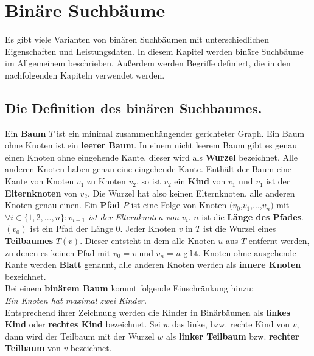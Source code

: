 \documentclass[a4paper,12pt]{article}
\begin{document}
\newpage
\section {Binäre Suchbäume}
Es gibt viele Varianten von binären Suchbäumen mit unterschiedlichen Eigenschaften und Leistungsdaten. In diesem Kapitel werden binäre Suchbäume im Allgemeinem beschrieben. Außerdem werden Begriffe definiert, die in den nachfolgenden Kapiteln verwendet werden. \\
\subsection {Die Definition des  binären Suchbaumes.}
Ein \textbf{Baum} $T$ ist ein minimal zusammenhängender gerichteter Graph. Ein Baum ohne Knoten ist ein \textbf{leerer Baum}. In einem nicht leerem Baum gibt es genau einen Knoten ohne eingehende Kante, dieser wird als \textbf{Wurzel}  bezeichnet. Alle anderen Knoten haben genau eine eingehende Kante.  Enthält der Baum eine Kante von Knoten $v_1$ zu Knoten $v_2$, so ist $v_2$ ein \textbf{Kind} von $v_1$ und $v_1$ ist der  \textbf{Elternknoten} von $v_2$. Die Wurzel hat also keinen Elternknoten, alle anderen Knoten genau einen.  Ein \textbf{Pfad} $P$ ist eine Folge von Knoten $(v_0$,$v_1$,...,$v_n)$ mit $\forall i \in \{ 1, 2,..., n \} \colon v_{i-1}$ \textit{ist der Elternknoten von} $v_i$. $n$ ist die \textbf{Länge des Pfades}. $\left(v_0\right)$ ist ein Pfad der Länge $0$. Jeder Knoten $v$ in $T$ ist die Wurzel eines \textbf{Teilbaumes} $T(v)$. Dieser entsteht in dem alle Knoten $u$ aus $T$ entfernt werden, zu denen es keinen Pfad mit  $v_0 = v$ und $v_n = u$ gibt. Knoten ohne ausgehende Kante werden \textbf{Blatt} genannt, alle anderen Knoten werden als \textbf{innere Knoten} bezeichnet.\\
Bei einem \textbf{binärem Baum} kommt folgende Einschränkung hinzu:  \\
\textit{Ein Knoten hat maximal zwei Kinder.}\\ 
Entsprechend ihrer Zeichnung werden die Kinder in Binärbäumen als \textbf{linkes Kind} oder \textbf{rechtes Kind} bezeichnet. Sei $w$ das linke, bzw. rechte Kind von $v$, dann wird der Teilbaum mit der Wurzel $w$ als \textbf{linker Teilbaum} bzw. \textbf{rechter Teilbaum}  von $v$ bezeichnet.  
\end{document}
